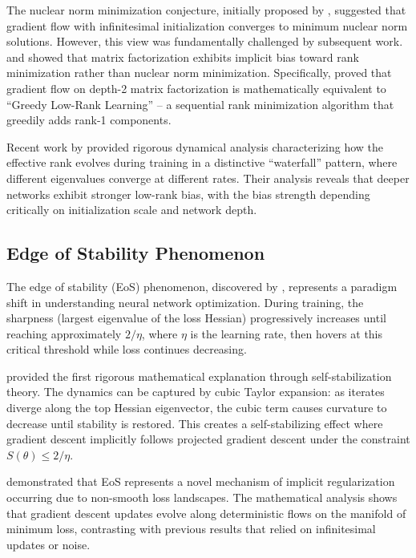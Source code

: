 \documentclass[11pt]{article}
\begin{document}
The nuclear norm minimization conjecture, initially proposed by \citet{gunasekar2017implicit}, suggested that gradient flow with infinitesimal initialization converges to minimum nuclear norm solutions. However, this view was fundamentally challenged by subsequent work. \citet{arora2019implicit} and \citet{li2020towards} showed that matrix factorization exhibits implicit bias toward rank minimization rather than nuclear norm minimization. Specifically, \citet{li2020towards} proved that gradient flow on depth-2 matrix factorization is mathematically equivalent to ``Greedy Low-Rank Learning'' -- a sequential rank minimization algorithm that greedily adds rank-1 components.

Recent work by \citet{chou2024gradient} provided rigorous dynamical analysis characterizing how the effective rank evolves during training in a distinctive ``waterfall'' pattern, where different eigenvalues converge at different rates. Their analysis reveals that deeper networks exhibit stronger low-rank bias, with the bias strength depending critically on initialization scale and network depth.

\subsection{Edge of Stability Phenomenon}

The edge of stability (EoS) phenomenon, discovered by \citet{cohen2021gradient}, represents a paradigm shift in understanding neural network optimization. During training, the sharpness (largest eigenvalue of the loss Hessian) progressively increases until reaching approximately $2/\eta$, where $\eta$ is the learning rate, then hovers at this critical threshold while loss continues decreasing.

\citet{damian2022self} provided the first rigorous mathematical explanation through self-stabilization theory. The dynamics can be captured by cubic Taylor expansion: as iterates diverge along the top Hessian eigenvector, the cubic term causes curvature to decrease until stability is restored. This creates a self-stabilizing effect where gradient descent implicitly follows projected gradient descent under the constraint $S(\theta) \leq 2/\eta$.

\citet{Arora2022Understanding} demonstrated that EoS represents a novel mechanism of implicit regularization occurring due to non-smooth loss landscapes. The mathematical analysis shows that gradient descent updates evolve along deterministic flows on the manifold of minimum loss, contrasting with previous results that relied on infinitesimal updates or noise.
\end{document}
